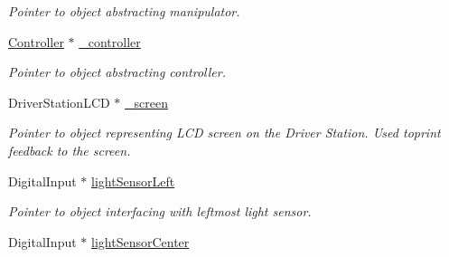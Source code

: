 \begin{DoxyCompactItemize}
\begin{DoxyCompactList}\small\item\em Pointer to object abstracting manipulator. \item\end{DoxyCompactList}\item 
\hypertarget{class_r_j_f_r_c2011_1_1_autonomous_ad5f5bd5da92e33c84b1227d98fe9db47}{
\hyperlink{class_r_j_f_r_c2011_1_1_controller}{Controller} $\ast$ \hyperlink{class_r_j_f_r_c2011_1_1_autonomous_ad5f5bd5da92e33c84b1227d98fe9db47}{\_\-controller}}
\label{class_r_j_f_r_c2011_1_1_autonomous_ad5f5bd5da92e33c84b1227d98fe9db47}

\begin{DoxyCompactList}\small\item\em Pointer to object abstracting controller. \item\end{DoxyCompactList}\item 
\hypertarget{class_r_j_f_r_c2011_1_1_autonomous_a45427a812f865b5d200b2642e53d44b0}{
DriverStationLCD $\ast$ \hyperlink{class_r_j_f_r_c2011_1_1_autonomous_a45427a812f865b5d200b2642e53d44b0}{\_\-screen}}
\label{class_r_j_f_r_c2011_1_1_autonomous_a45427a812f865b5d200b2642e53d44b0}

\begin{DoxyCompactList}\small\item\em Pointer to object representing LCD screen on the Driver Station. Used toprint feedback to the screen. \item\end{DoxyCompactList}\item 
\hypertarget{class_r_j_f_r_c2011_1_1_autonomous_ae6c458fcfb8244e4e112c6a836bb5609}{
DigitalInput $\ast$ \hyperlink{class_r_j_f_r_c2011_1_1_autonomous_ae6c458fcfb8244e4e112c6a836bb5609}{lightSensorLeft}}
\label{class_r_j_f_r_c2011_1_1_autonomous_ae6c458fcfb8244e4e112c6a836bb5609}

\begin{DoxyCompactList}\small\item\em Pointer to object interfacing with leftmost light sensor. \item\end{DoxyCompactList}\item 
\hypertarget{class_r_j_f_r_c2011_1_1_autonomous_a4b9f4445f2514da0e59f9129b1b247d3}{
DigitalInput $\ast$ \hyperlink{class_r_j_f_r_c2011_1_1_autonomous_a4b9f4445f2514da0e59f9129b1b247d3}{lightSensorCenter}}
\label{class_r_j_f_r_c2011_1_1_autonomous_a4b9f4445f2514da0e59f9129b1b247d3}


\end{DoxyCompactItemize}
